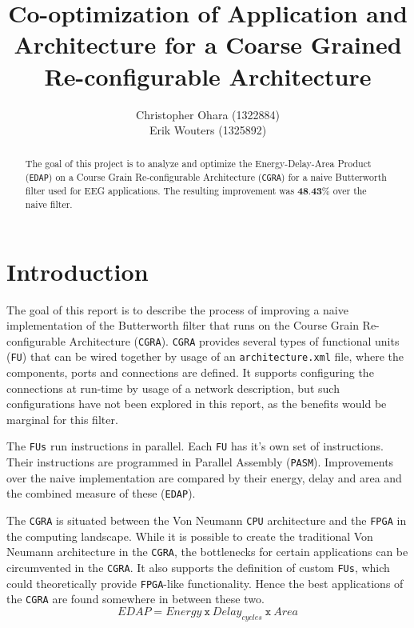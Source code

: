 \documentclass[letterpaper, 10 pt, conference]{ieeeconf}  %
\title{\LARGE \bf
Co-optimization of Application and Architecture
for a Coarse Grained Re-configurable Architecture
}
\author{Christopher Ohara (1322884) \\
Erik Wouters (1325892)
}
\begin{document}
\maketitle
\thispagestyle{empty}
\pagestyle{empty}

\begin{abstract}

The goal of this project is to analyze and optimize the Energy-Delay-Area Product (\texttt{EDAP}) on a Course Grain Re-configurable Architecture (\texttt{CGRA}) for a naive Butterworth filter used for EEG applications. The resulting improvement was $\textbf{48.43\%}$ over the naive filter.

\end{abstract}

\section{Introduction}

The goal of this report is to describe the process of improving a naive implementation of the Butterworth filter\cite{Podder} that runs on the Course Grain Re-configurable Architecture (\texttt{CGRA}). \texttt{CGRA} provides several types of functional units (\texttt{FU}) that can be wired together by usage of an \texttt{architecture.xml} file, where the components, ports and connections are defined. It supports configuring the connections at run-time by usage of a network description, but such configurations have not been explored in this report, as the benefits would be marginal for this filter.

The \texttt{FUs} run instructions in parallel. Each \texttt{FU} has it's own set of instructions. Their instructions are programmed in Parallel Assembly (\texttt{PASM}). Improvements over the naive implementation are compared by their energy, delay and area and the combined measure of these (\texttt{EDAP}).

The \texttt{CGRA} is situated between the Von Neumann \texttt{CPU} architecture\cite{Neumann} and the \texttt{FPGA} in the computing landscape. While it is possible to create the traditional Von Neumann architecture in the \texttt{CGRA}, the bottlenecks for certain applications can be circumvented in the \texttt{CGRA}. It also supports the definition of custom \texttt{FUs}, which could theoretically provide \texttt{FPGA}-like functionality. Hence the best applications of the \texttt{CGRA} are found somewhere in between these two.
\[
EDAP = Energy \  \texttt{x} \  Delay_{cycles} \ \texttt{x} \
Area 
\]
\end{document}
